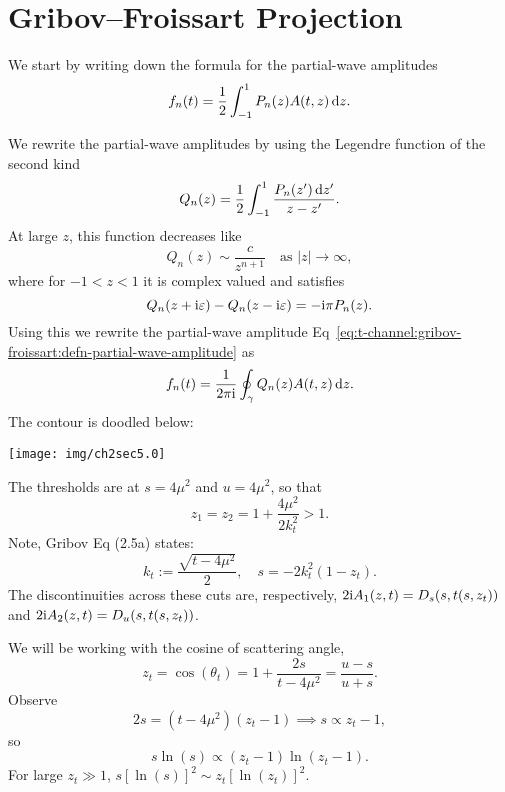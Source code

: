 \section{Gribov--Froissart Projection}

\M
We start by writing down the formula for the partial-wave amplitudes
\begin{equation}\label{eq:t-channel:gribov-froissart:defn-partial-wave-amplitude}
f_{n}(t) = \frac{1}{2}\int^{1}_{-1}P_{n}(z)A(t,z)\,\mathrm{d} z.
\end{equation}

\M
We rewrite the partial-wave amplitudes by using the Legendre function of
the second kind
\begin{equation}
Q_{n}(z) = \frac{1}{2}\int^{1}_{-1}\frac{P_{n}(z')\,\mathrm{d} z'}{z-z'}.
\end{equation}
At large $z$, this function decreases like
\begin{equation}
Q_{n}(z)\sim\frac{c}{z^{n+1}}\quad\mbox{as }|z|\to\infty,
\end{equation}
where for $-1<z<1$ it is complex valued and satisfies
\begin{equation}
Q_{n}(z+\mathrm{i}\varepsilon)-Q_{n}(z-\mathrm{i}\varepsilon)=-\mathrm{i}\pi P_{n}(z).
\end{equation}
Using this we rewrite the partial-wave amplitude Eq~\eqref{eq:t-channel:gribov-froissart:defn-partial-wave-amplitude}
as
\begin{equation}
f_{n}(t) = \frac{1}{2\pi\mathrm{i}}\oint_{\gamma} Q_{n}(z)A(t,z)\,\mathrm{d} z.
\end{equation}
The contour is doodled below:
\begin{center}
  \texttt{[image: img/ch2sec5.0]}
\end{center}

\M
The thresholds are at $s=4\mu^{2}$ and $u=4\mu^{2}$, so that
\begin{equation}
z_{1} = z_{2} = 1 + \frac{4\mu^{2}}{2k_{t}^{2}} > 1.
\end{equation}
Note, Gribov Eq (2.5a) states:
\begin{equation}
k_{t} := \frac{\sqrt{t - 4\mu^{2}}}{2},\quad s = -2k_{t}^{2}(1 - z_{t}).
\end{equation}
The discontinuities across these cuts are, respectively, $2\mathrm{i}A_{1}(z,t)=D_{s}(s,t(s,z_{t}))$
and $2\mathrm{i}A_{2}(z,t) = D_{u}(s,t(s,z_{t}))$.

We will be working with the cosine of scattering angle,
\begin{equation}
z_{t} = \cos(\theta_{t}) = 1 + \frac{2s}{t - 4\mu^{2}} = \frac{u-s}{u+s}.
\end{equation}
Observe
\begin{equation}
2s = (t - 4\mu^{2})(z_{t}-1)\implies s\propto z_{t}-1,
\end{equation}
so
\begin{equation}
s\ln(s) \propto (z_{t}-1)\ln(z_{t}-1).
\end{equation}
For large $z_{t}\gg1$, $s[\ln(s)]^{2}\sim z_{t}[\ln(z_{t})]^{2}$.


